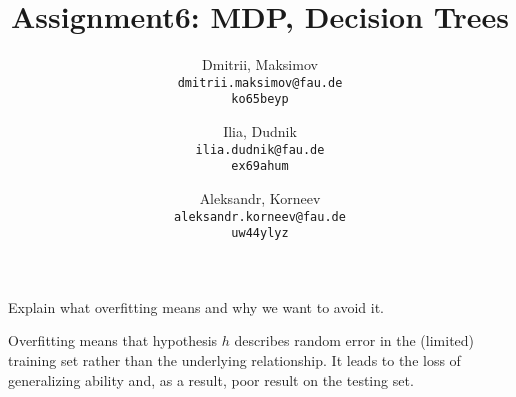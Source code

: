 \documentclass{homework}
\title{Assignment6: MDP, Decision Trees}
\author{
  Dmitrii, Maksimov\\
  \texttt{dmitrii.maksimov@fau.de} \\
  \texttt{ko65beyp}
  \and
  Ilia, Dudnik\\
  \texttt{ilia.dudnik@fau.de}\\
  \texttt{ex69ahum}
  \and
  Aleksandr, Korneev\\
  \texttt{aleksandr.korneev@fau.de}\\
  \texttt{uw44ylyz}
}
\begin{document}
\maketitle

\exercise[6.1 (Overfitting)]
Explain what overfitting means and why we want to avoid it.

Overfitting means that hypothesis $h$ describes random error in the (limited) training set rather than the underlying relationship. It leads to the loss of generalizing ability and, as a result, poor result on the testing set. 	
\end{document}

